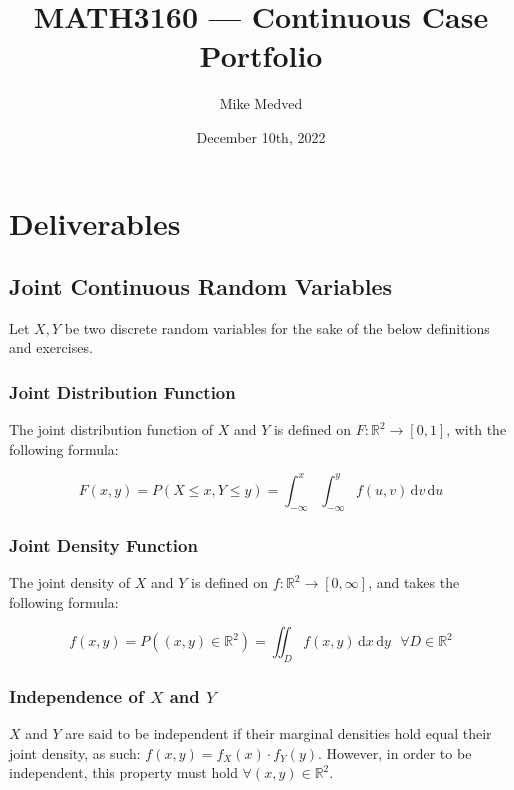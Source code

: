 \documentclass{article}
\title{MATH3160 — Continuous Case Portfolio}
\author{Mike Medved}
\date{December 10th, 2022}
\begin{document}
\maketitle

\section{Deliverables}

\subsection{Joint Continuous Random Variables}

Let $X, Y$ be two discrete random variables for the sake of the below definitions and exercises.

\subsubsection{Joint Distribution Function}

The joint distribution function of $X$ and $Y$ is defined on $F \colon \mathbb{R}^2 \rightarrow [0,1]$, with the following formula:

\begin{equation*}
    F(x,y) = P(X \leq x, Y \leq y) = \int_{-\infty}^x \int_{-\infty}^y f(u, v) \, \mathrm{d}v \, \mathrm{d}u
\end{equation*}

\subsubsection{Joint Density Function}

The joint density of $X$ and $Y$ is defined on $f \colon \mathbb{R}^2 \rightarrow [0,\infty]$, and takes the following formula:

\begin{equation*}
    f(x,y) = P((x, y) \in \mathbb{R}^2) = \iint_D f(x,y) \, \mathrm{d}x \, \mathrm{d}y \text{ } \forall D \in \mathbb{R}^2
\end{equation*}

\subsubsection{Independence of $X$ and $Y$}

$X$ and $Y$ are said to be independent if their marginal densities hold equal their joint density, as such: $f(x,y)=f_X(x) \cdot f_Y(y)$. However, in order to be independent, this property must hold $\forall (x,y) \in \mathbb{R}^2$.
\end{document}
